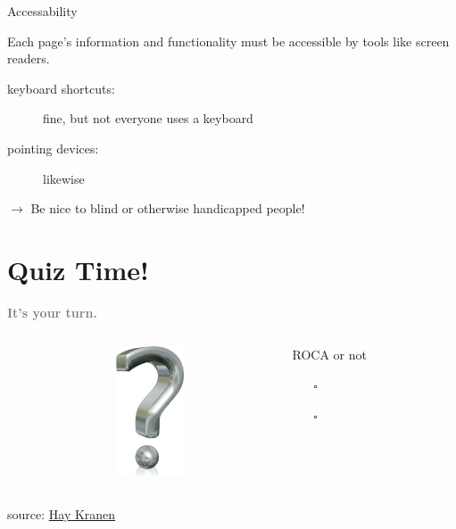 \documentclass{beamer}
\newcommand{\rocaok}{\ding{51}}
\newcommand{\rocafail}{\ding{55}}
\begin{document}
\begin{frame}{Accessability}

  Each page's information and functionality must be accessible by tools like screen readers.

  \begin{description}
    \item[keyboard shortcuts:] fine, but not everyone uses a keyboard
    \item[pointing devices:] likewise
  \end{description}

  \ensuremath{\rightarrow} Be nice to blind or otherwise handicapped people!
\end{frame}

\section{Quiz Time!}

\begin{frame}
  \vspace*{-1cm}
  \textcolor{gray}{
    \begin{center}
      \textbf{
        \fontsize{50}{50}\selectfont It's your turn.
      }
    \end{center}
  }
\end{frame}

\begin{frame}{\insertsectionhead}
  \vspace*{0.5in}

  \begin{columns}
    \begin{column}{2.2cm}
    \end{column}

    \begin{column}{2.2cm}
      \includegraphics[width=2cm]{images/quiz.png}
    \end{column}

    \begin{column}{6.6cm}
      ROCA or not
      \vspace{0.3cm}
      \begin{itemize}
        \item[$\square$] \rocaok
        \item[$\square$] \rocafail
      \end{itemize}
    \end{column}
  \end{columns}

  \vspace*{0.4in}
  \tiny source: \href{http://commons.wikimedia.org/wiki/File:Question_mark_3d.png}{Hay Kranen}
\end{frame}
\end{document}
